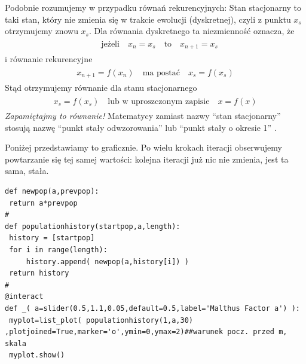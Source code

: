 \documentclass[a4paper,12pt,polish]{sphinxmanual}
\begin{document}
Podobnie rozumujemy w przypadku równań rekurencyjnych:  Stan stacjonarny to taki stan, który nie zmienia się w trakcie ewolucji (dyskretnej), czyli z punktu $x_s$ otrzymujemy znowu $x_s$. Dla równania dyskretnego ta niezmienność oznacza, że
\label{ch1/chI031:equation-eqn9}\begin{gather}
\begin{split}\quad \mbox{jeżeli} \quad x_n = x_s \quad \mbox{to} \quad x_{n+1} = x_s\end{split}\label{ch1/chI031-eqn9}
\end{gather}
i równanie rekurencyjne
\label{ch1/chI031:equation-eqn10}\begin{gather}
\begin{split}x_{n+1} = f(x_n) \quad \mbox{ma postać} \quad x_s = f(x_s)\end{split}\label{ch1/chI031-eqn10}
\end{gather}
Stąd otrzymujemy równanie dla stanu stacjonarnego
\label{ch1/chI031:equation-eqn11}\begin{gather}
\begin{split}x_s = f(x_s) \quad \mbox{lub w uproszczonym zapisie} \quad x=f(x)\end{split}\label{ch1/chI031-eqn11}
\end{gather}
\emph{Zapamiętajmy to równanie!} Matematycy zamiast nazwy ``stan stacjonarny'' stosują nazwę ``punkt stały odwzorowania'' lub ``punkt stały o okresie 1'' .

Poniżej przedstawiamy to graficznie. Po wielu krokach iteracji obserwujemy powtarzanie się tej samej wartości: kolejna iteracji już nic nie zmienia, jest ta sama, stała.


\begin{verbatim}
def newpop(a,prevpop):
 return a*prevpop
#
def populationhistory(startpop,a,length):
 history = [startpop]
 for i in range(length):
     history.append( newpop(a,history[i]) )
 return history
#
@interact
def _( a=slider(0.5,1.1,0.05,default=0.5,label='Malthus Factor a') ):
 myplot=list_plot( populationhistory(1,a,30) ,plotjoined=True,marker='o',ymin=0,ymax=2)##warunek pocz. przed m, skala
 myplot.show()
\end{verbatim}
\end{document}

